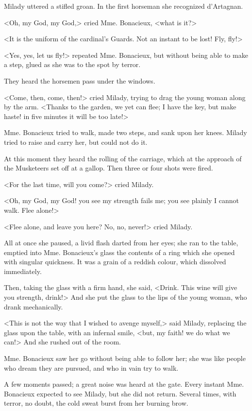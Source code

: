 Milady uttered a stifled groan. In the first horseman she recognized d'Artagnan. 

<Oh, my God, my God,> cried Mme. Bonacieux, <what is it?> 

<It is the uniform of the cardinal's Guards. Not an instant to be lost! Fly, fly!> 

<Yes, yes, let us fly!> repeated Mme. Bonacieux, but without being able to make a step, glued as she was to the spot by terror. 

They heard the horsemen pass under the windows. 

<Come, then, come, then!> cried Milady, trying to drag the young woman along by the arm. <Thanks to the garden, we yet can flee; I have the key, but make haste! in five minutes it will be too late!> 

Mme. Bonacieux tried to walk, made two steps, and sank upon her knees. Milady tried to raise and carry her, but could not do it. 

At this moment they heard the rolling of the carriage, which at the approach of the Musketeers set off at a gallop. Then three or four shots were fired. 

<For the last time, will you come?> cried Milady. 

<Oh, my God, my God! you see my strength fails me; you see plainly I cannot walk. Flee alone!> 

<Flee alone, and leave you here? No, no, never!> cried Milady. 

All at once she paused, a livid flash darted from her eyes; she ran to the table, emptied into Mme. Bonacieux's glass the contents of a ring which she opened with singular quickness. It was a grain of a reddish colour, which dissolved immediately. 

Then, taking the glass with a firm hand, she said, <Drink. This wine will give you strength, drink!> And she put the glass to the lips of the young woman, who drank mechanically. 

<This is not the way that I wished to avenge myself,> said Milady, replacing the glass upon the table, with an infernal smile, <but, my faith! we do what we can!> And she rushed out of the room. 

Mme. Bonacieux saw her go without being able to follow her; she was like people who dream they are pursued, and who in vain try to walk. 

A few moments passed; a great noise was heard at the gate. Every instant Mme. Bonacieux expected to see Milady, but she did not return. Several times, with terror, no doubt, the cold sweat burst from her burning brow. 

